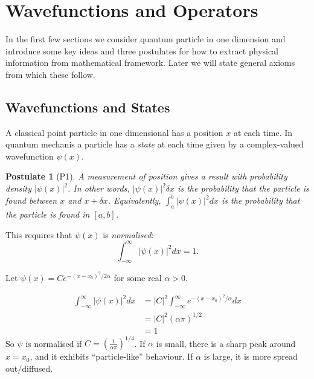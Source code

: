 \documentclass[a4paper]{article}
\newtheorem*{postulate}{Postulate}
\begin{document}
\section{Wavefunctions and Operators}

In the first few sections we consider quantum particle in one dimension and introduce some key ideas and three postulates for how to extract physical information from mathematical framework. Later we will state general axioms from which these follow.

\subsection{Wavefunctions and States}

A classical point particle in one dimensional has a position $x$ at each time. In quantum mechanis a particle has a \emph{state} at each time given by a complex-valued wavefunction $\psi(x)$.

\begin{postulate}[P1]
  \label{postulate:1}
  A measurement of position gives a result with probability density $|\psi(x)|^2$. In other words, $|\psi(x)|^2 \delta x$ is the probability that the particle is found between $x$ and $x+\delta x$. Equivalently, $\int_a^b |\psi(x)|^2 dx$ is the probability that the particle is found in $[a,b]$.
\end{postulate}

This requires that $\psi(x)$ is \emph{normalised}:
\[
  \int_{-\infty}^\infty |\psi(x)|^2 dx = 1.
\]

\begin{eg}
  Let $\psi(x) = C e^{-(x-x_0)^2/2\alpha}$ for some real $\alpha>0$.
  \begin{center}
  \end{center}
  \begin{align*}
    \int_{-\infty}^\infty |\psi(x)|^2 dx &= |C|^2 \int_{-\infty}^\infty e^{-(x-x_0)^2/\alpha} dx \\
    &= |C|^2 (\alpha\pi)^{1/2} \\
    &= 1
  \end{align*}
  So $\psi$ is normalised if $C=(\frac{1}{\alpha\pi})^{1/4}$. If $\alpha$ is small, there is a sharp peak around $x=x_0$, and it exhibits ``particle-like'' behaviour. If $\alpha$ is large, it is more spread out/diffused.
\end{eg}
\end{document}
